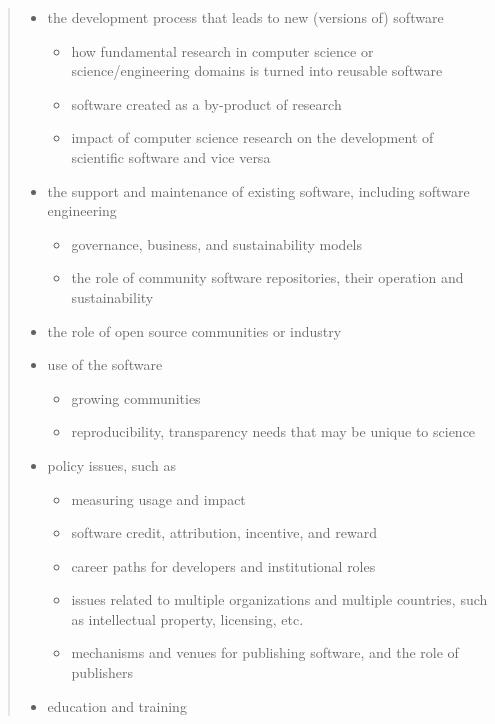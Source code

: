 \documentclass[11pt, oneside]{amsart}
\begin{document}
\begin{quote}
\begin{itemize}[leftmargin=0.2in]
\item the development process that leads to new (versions of) software
\begin{itemize}[leftmargin=0.2in]
\item how fundamental research in computer science or
  science/engineering domains is turned into reusable software
\item software created as a by-product of research
\item impact of computer science research on the development of
    scientific software and vice versa
\end{itemize}
\item the support and maintenance of existing software, including
  software engineering
\begin{itemize}[leftmargin=0.2in]
\item governance, business, and sustainability models
\item the role of community software repositories, their operation and
  sustainability
\end{itemize}
\item the role of open source communities or industry
\item use of the software
\begin{itemize}[leftmargin=0.2in]
\item growing communities
\item reproducibility, transparency needs that may be unique to science
\end{itemize}
\item policy issues, such as
\begin{itemize}[leftmargin=0.2in]
\item measuring usage and impact
\item software credit, attribution, incentive, and reward
\item career paths for developers and institutional roles
\item issues related to multiple organizations and multiple countries,
  such as intellectual property, licensing, etc.
\item mechanisms and venues for publishing software, and the role of
  publishers
\end{itemize}
\item education and training
\end{itemize}


\end{quote}
\end{document}
